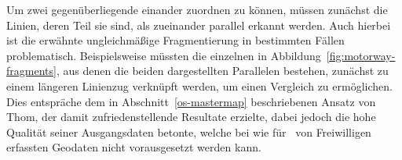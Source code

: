 \documentclass[../main/thesis.tex]{subfiles}
\begin{document}

Um zwei gegenüberliegende  einander zuordnen zu können, müssen zunächst die Linien, deren Teil sie sind, als zueinander parallel erkannt werden.
Auch hierbei ist die erwähnte ungleichmäßige Fragmentierung in bestimmten Fällen problematisch.
Beispielsweise müssten die einzelnen  in Abbildung~\ref{fig:motorway-fragments}, aus denen die beiden dargestellten Parallelen bestehen, zunächst zu einem längeren Linienzug verknüpft werden, um einen Vergleich zu ermöglichen.
Dies entspräche dem in Abschnitt~\ref{os-mastermap} beschriebenen Ansatz von Thom, der damit zufriedenstellende Resultate erzielte, dabei jedoch die hohe Qualität seiner Ausgangsdaten betonte, welche bei wie für \osm\ von Freiwilligen erfassten Geodaten nicht vorausgesetzt werden kann.
\end{document}
